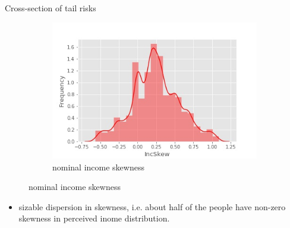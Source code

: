 \documentclass{beamer}
\begin{document}
\begin{frame}{Cross-section of tail risks}
	\begin{figure}
	\centering
	\label{incskew_hist}
	\begin{subfigure}[b]{0.45\textwidth}
		\centering
		\caption{nominal income skewness}
		\includegraphics[width=\textwidth]{figures/histincSkew}
	\end{subfigure}
\end{figure}
	\begin{itemize}
		\item sizable dispersion in skewness, i.e. about half of the people have non-zero skewness in perceived inome distribution. 
	\end{itemize}
\end{frame}



\end{document}
